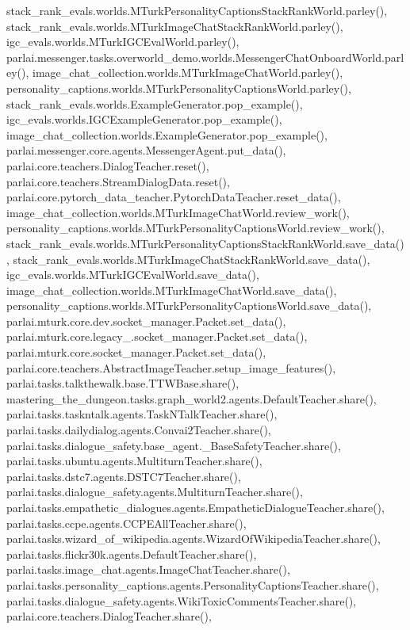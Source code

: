 stack\+\_\+rank\+\_\+evals.\+worlds.\+M\+Turk\+Personality\+Captions\+Stack\+Rank\+World.\+parley(), stack\+\_\+rank\+\_\+evals.\+worlds.\+M\+Turk\+Image\+Chat\+Stack\+Rank\+World.\+parley(), igc\+\_\+evals.\+worlds.\+M\+Turk\+I\+G\+C\+Eval\+World.\+parley(), parlai.\+messenger.\+tasks.\+overworld\+\_\+demo.\+worlds.\+Messenger\+Chat\+Onboard\+World.\+parley(), image\+\_\+chat\+\_\+collection.\+worlds.\+M\+Turk\+Image\+Chat\+World.\+parley(), personality\+\_\+captions.\+worlds.\+M\+Turk\+Personality\+Captions\+World.\+parley(), stack\+\_\+rank\+\_\+evals.\+worlds.\+Example\+Generator.\+pop\+\_\+example(), igc\+\_\+evals.\+worlds.\+I\+G\+C\+Example\+Generator.\+pop\+\_\+example(), image\+\_\+chat\+\_\+collection.\+worlds.\+Example\+Generator.\+pop\+\_\+example(), parlai.\+messenger.\+core.\+agents.\+Messenger\+Agent.\+put\+\_\+data(), parlai.\+core.\+teachers.\+Dialog\+Teacher.\+reset(), parlai.\+core.\+teachers.\+Stream\+Dialog\+Data.\+reset(), parlai.\+core.\+pytorch\+\_\+data\+\_\+teacher.\+Pytorch\+Data\+Teacher.\+reset\+\_\+data(), image\+\_\+chat\+\_\+collection.\+worlds.\+M\+Turk\+Image\+Chat\+World.\+review\+\_\+work(), personality\+\_\+captions.\+worlds.\+M\+Turk\+Personality\+Captions\+World.\+review\+\_\+work(), stack\+\_\+rank\+\_\+evals.\+worlds.\+M\+Turk\+Personality\+Captions\+Stack\+Rank\+World.\+save\+\_\+data(), stack\+\_\+rank\+\_\+evals.\+worlds.\+M\+Turk\+Image\+Chat\+Stack\+Rank\+World.\+save\+\_\+data(), igc\+\_\+evals.\+worlds.\+M\+Turk\+I\+G\+C\+Eval\+World.\+save\+\_\+data(), image\+\_\+chat\+\_\+collection.\+worlds.\+M\+Turk\+Image\+Chat\+World.\+save\+\_\+data(), personality\+\_\+captions.\+worlds.\+M\+Turk\+Personality\+Captions\+World.\+save\+\_\+data(), parlai.\+mturk.\+core.\+dev.\+socket\+\_\+manager.\+Packet.\+set\+\_\+data(), parlai.\+mturk.\+core.\+legacy\+\_.\+socket\+\_\+manager.\+Packet.\+set\+\_\+data(), parlai.\+mturk.\+core.\+socket\+\_\+manager.\+Packet.\+set\+\_\+data(), parlai.\+core.\+teachers.\+Abstract\+Image\+Teacher.\+setup\+\_\+image\+\_\+features(), parlai.\+tasks.\+talkthewalk.\+base.\+T\+T\+W\+Base.\+share(), mastering\+\_\+the\+\_\+dungeon.\+tasks.\+graph\+\_\+world2.\+agents.\+Default\+Teacher.\+share(), parlai.\+tasks.\+taskntalk.\+agents.\+Task\+N\+Talk\+Teacher.\+share(), parlai.\+tasks.\+dailydialog.\+agents.\+Convai2\+Teacher.\+share(), parlai.\+tasks.\+dialogue\+\_\+safety.\+base\+\_\+agent.\+\_\+\+Base\+Safety\+Teacher.\+share(), parlai.\+tasks.\+ubuntu.\+agents.\+Multiturn\+Teacher.\+share(), parlai.\+tasks.\+dstc7.\+agents.\+D\+S\+T\+C7\+Teacher.\+share(), parlai.\+tasks.\+dialogue\+\_\+safety.\+agents.\+Multiturn\+Teacher.\+share(), parlai.\+tasks.\+empathetic\+\_\+dialogues.\+agents.\+Empathetic\+Dialogue\+Teacher.\+share(), parlai.\+tasks.\+ccpe.\+agents.\+C\+C\+P\+E\+All\+Teacher.\+share(), parlai.\+tasks.\+wizard\+\_\+of\+\_\+wikipedia.\+agents.\+Wizard\+Of\+Wikipedia\+Teacher.\+share(), parlai.\+tasks.\+flickr30k.\+agents.\+Default\+Teacher.\+share(), parlai.\+tasks.\+image\+\_\+chat.\+agents.\+Image\+Chat\+Teacher.\+share(), parlai.\+tasks.\+personality\+\_\+captions.\+agents.\+Personality\+Captions\+Teacher.\+share(), parlai.\+tasks.\+dialogue\+\_\+safety.\+agents.\+Wiki\+Toxic\+Comments\+Teacher.\+share(), parlai.\+core.\+teachers.\+Dialog\+Teacher.\+share(), 